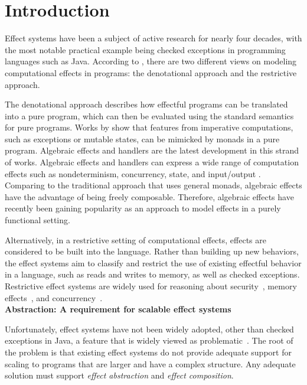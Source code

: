 
\chapter{Introduction}


Effect systems have been a subject of active research for nearly four decades, with the most notable practical example being checked exceptions in programming languages such as Java. According to \citet{filinski10}, there are two different views on modeling computational effects in programs: the denotational approach and the restrictive approach.

The denotational approach describes how effectful programs can be translated into a pure program, which can then be evaluated using the standard semantics for pure programs. Works by \citet{moggi89} show that features from imperative computations, such as exceptions or mutable states, can be mimicked by monads in a pure program. Algebraic effects and handlers \cite{plotkin09} are the latest development in this strand of works. Algebraic effects and handlers can express a wide range of computation effects such as nondeterminism, concurrency, state, and input/output \cite{plotkin09}. Comparing to the traditional approach that uses general monads, algebraic effects have the advantage of being freely composable. Therefore, algebraic effects have recently been gaining popularity as an approach to model effects in a purely functional setting.

Alternatively, in a restrictive setting of computational effects, effects are considered to be built into the language. Rather than building up new behaviors, the effect systems aim to classify and restrict the use of existing effectful behavior in a language, such as reads and writes to memory, as well as checked exceptions. Restrictive effect systems are widely used for reasoning about security~\cite{turbak08}, memory effects~\cite{lucassen88}, and concurrency~\cite{bocchino09,bracevac18,dolan17}. \\

\noindent\textbf{Abstraction: A requirement for scalable effect systems}

 Unfortunately, effect systems have not been widely adopted, other than checked exceptions in Java, a feature that is widely viewed as problematic~\cite{10.1145/1103845.1094847}.  The root of the problem is that existing effect systems do not provide adequate support for scaling to programs that are larger and have a complex structure.  Any adequate solution must support \textit{effect abstraction} and \textit{effect composition}.

